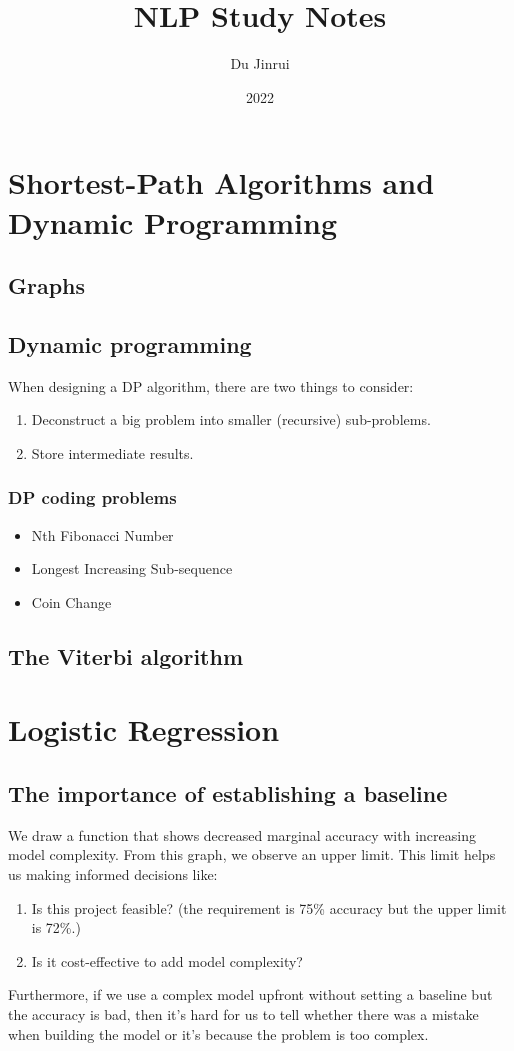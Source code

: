 \documentclass{report}
\title{NLP Study Notes}
\author{Du Jinrui}
\date{2022}
\begin{document}
  \maketitle
  \tableofcontents
  \chapter{Shortest-Path Algorithms and Dynamic Programming}
  \section{Graphs}
  \section{Dynamic programming}
  When designing a DP algorithm, there are two things to consider:
  \begin{enumerate}
  	\item Deconstruct a big problem into smaller (recursive) sub-problems.
	\item Store intermediate results.
  \end{enumerate}
  \subsection{DP coding problems}
  \begin{itemize}
    \item Nth Fibonacci Number
    \item Longest Increasing Sub-sequence
    \item Coin Change
  \end{itemize}
  \section{The Viterbi algorithm}

  \chapter{Logistic Regression}
  \section{The importance of establishing a baseline}
  We draw a function that shows decreased marginal accuracy with increasing model complexity. From this graph, we observe an upper limit. This limit helps us making informed decisions like:
		\begin{enumerate}
			\item Is this project feasible? (the requirement is 75\% accuracy but the upper limit is 72\%.)
			\item Is it cost-effective to add model complexity?
		\end{enumerate}
Furthermore, if we use a complex model upfront without setting a baseline but the accuracy is bad, then it's hard for us to tell whether there was a mistake when building the model or it's because the problem is too complex.
\end{document}
